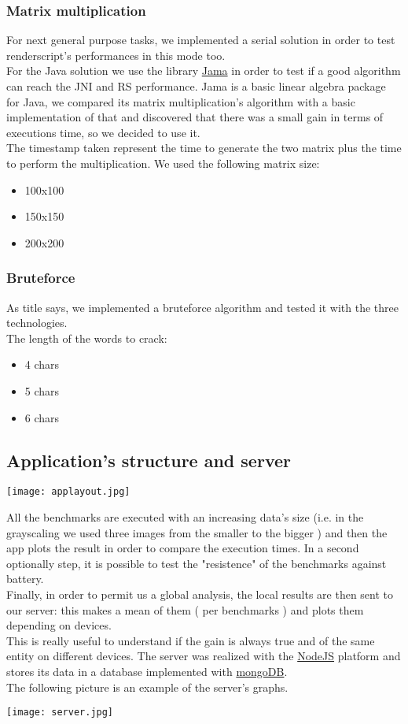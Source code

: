 \documentclass[11pt,english]{article}
\begin{document}
\subsubsection{Matrix multiplication}
For next general purpose tasks, we implemented a serial solution in order to test renderscript's performances in this mode too.\\For the Java solution we use the library \href{http://math.nist.gov/javanumerics/jama/}{Jama}\cite{jama} in order to test if a good algorithm can reach the JNI and RS performance. Jama is a basic linear algebra package for Java, we compared its matrix multiplication's algorithm with a basic implementation of that and discovered that there was a small gain in terms of executions time, so we decided to use it.\\The timestamp taken represent the time to generate the two matrix plus the time to perform the multiplication. We used the following matrix size:
\begin{itemize}
\item 100x100
\item 150x150	
\item 200x200
\end{itemize} 
\subsubsection{Bruteforce}
As title says, we implemented a bruteforce algorithm and tested it with the three technologies.\\
The length of the words to crack:
\begin{itemize}
\item 4 chars
\item 5 chars
\item 6 chars 
\end{itemize}

\subsection{Application's structure and server}
\begin{center}
\texttt{[image: applayout.jpg]}
\end{center}
All the benchmarks are executed with an increasing data's size (i.e. in the grayscaling we used three images from the smaller to the bigger ) and then the app plots the result in order to compare the execution times. In a second optionally step, it is possible to test the "resistence" of the benchmarks against battery.\\Finally, in order to permit us a global analysis, the local results are then sent to our server: this makes a mean of them ( per benchmarks ) and plots them depending on devices.\\This is really useful to understand if the gain is always true and of the same entity on different devices. The server was realized with the \href{http://nodejs.org/}{NodeJS} platform and stores its data in a database implemented with \href{http://www.mongodb.org/}{mongoDB}.\\The following picture is an example of the server's graphs.
\begin{center}
\texttt{[image: server.jpg]}
\end{center}
\end{document}
